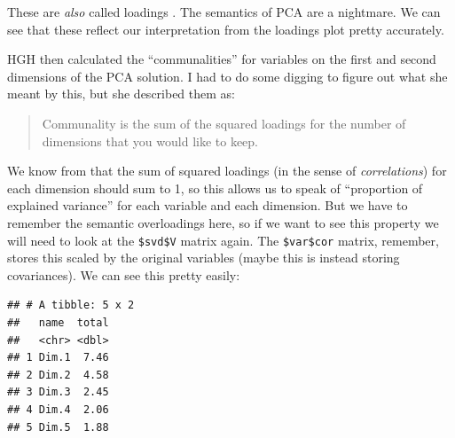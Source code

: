 \documentclass[
]{book}
\newenvironment{Shaded}{\begin{snugshade}}{\end{snugshade}}
\newcommand{\AttributeTok}[1]{\textcolor[rgb]{0.13,0.29,0.53}{#1}}
\newcommand{\CommentTok}[1]{\textcolor[rgb]{0.56,0.35,0.01}{\textit{#1}}}
\newcommand{\DecValTok}[1]{\textcolor[rgb]{0.00,0.00,0.81}{#1}}
\newcommand{\FunctionTok}[1]{\textcolor[rgb]{0.13,0.29,0.53}{\textbf{#1}}}
\newcommand{\NormalTok}[1]{#1}
\newcommand{\SpecialCharTok}[1]{\textcolor[rgb]{0.81,0.36,0.00}{\textbf{#1}}}
\newcommand{\StringTok}[1]{\textcolor[rgb]{0.31,0.60,0.02}{#1}}
\begin{document}
These are \emph{also} called loadings \citep{abdiPrincipal2010}. The semantics of PCA are a nightmare. We can see that these reflect our interpretation from the loadings plot pretty accurately.

HGH then calculated the ``communalities'' for variables on the first and second dimensions of the PCA solution. I had to do some digging to figure out what she meant by this, but she described them as:

\begin{quote}
Communality is the sum of the squared loadings for the number of dimensions that you would like to keep.
\end{quote}

We know from \citet{abdiPrincipal2010} that the sum of squared loadings (in the sense of \emph{correlations}) for each dimension should sum to 1, so this allows us to speak of ``proportion of explained variance'' for each variable and each dimension. But we have to remember the semantic overloadings here, so if we want to see this property we will need to look at the \texttt{\$svd\$V} matrix again. The \texttt{\$var\$cor} matrix, remember, stores this scaled by the original variables (maybe this is instead storing covariances). We can see this pretty easily:

\begin{Shaded}
\end{Shaded}

\begin{verbatim}
## # A tibble: 5 x 2
##   name  total
##   <chr> <dbl>
## 1 Dim.1  7.46
## 2 Dim.2  4.58
## 3 Dim.3  2.45
## 4 Dim.4  2.06
## 5 Dim.5  1.88
\end{verbatim}
\end{document}

